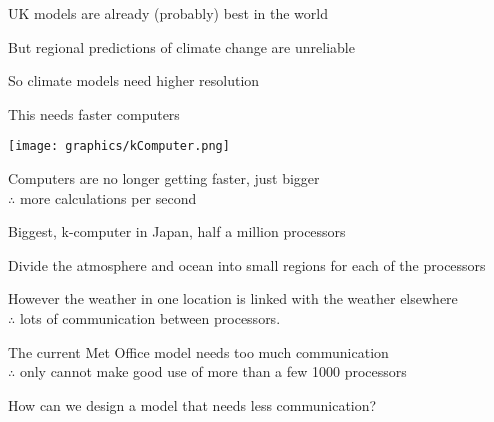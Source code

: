 \begin{slide}

\begin{minipage}{0.68\linewidth}

\begin{list0}

\item UK models are already (probably) best in the world
\item But regional predictions of climate change are unreliable
\item So climate models need higher resolution
\item This needs faster computers
\end{list0}
\end{minipage}
\begin{minipage}{0.3\linewidth}
\texttt{[image: graphics/kComputer.png]}

\vspace{-1in}
\end{minipage}

\begin{list0}
\item Computers are no longer getting faster, just bigger\\
    $\therefore$ more calculations per second
    \begin{list1}
    \item Biggest, k-computer in Japan, half a million processors
    \end{list1}
\item Divide the atmosphere and ocean into small regions for each of the processors
\item However the weather in one location is linked with the weather elsewhere\\
    $\therefore$ lots of communication between processors.
\item The current Met Office model needs too much communication\\
    $\therefore$ only cannot make good use of more than a few 1000 processors
\item How can we design a model that needs less communication?
\end{list0}

\end{slide}

